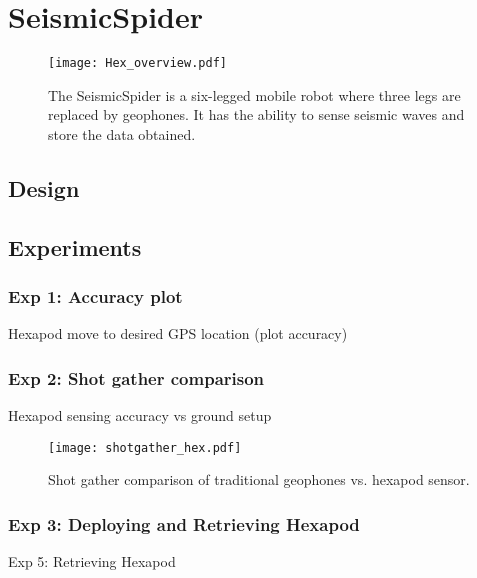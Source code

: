 \section{SeismicSpider}\label{sec:SeismicSpider}
\begin{figure} \centering
  {\texttt{[image: Hex\_overview.pdf]}}
 \caption{The SeismicSpider is a six-legged mobile robot where three legs are replaced by geophones. It has the ability to sense seismic waves and store the data obtained.} 
 \label{fig:TradvsAutoDrop}
\end{figure}
\subsection{Design}

\subsection{Experiments}
\subsubsection{Exp 1: Accuracy plot}
Hexapod move to desired GPS location  (plot accuracy)\\
\subsubsection{Exp 2: Shot gather comparison}
Hexapod sensing accuracy vs ground setup\\
\begin{figure} \centering
  {\texttt{[image: shotgather\_hex.pdf]}}
 \caption{Shot gather comparison of traditional geophones vs. hexapod sensor. 
 \label{fig:TradvsAutoDrop}}
\end{figure}
\subsubsection{Exp 3: Deploying and Retrieving Hexapod}
Exp 5: Retrieving Hexapod\\